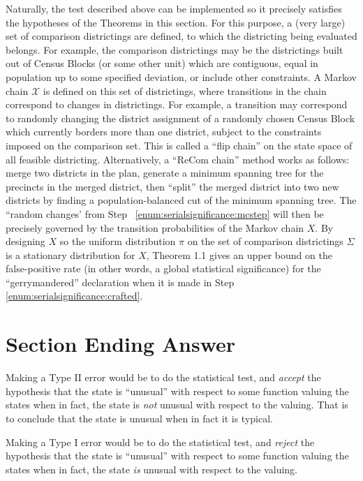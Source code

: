 \documentclass[12pt]{article}
\begin{document}
Naturally, the test described above can be implemented so it precisely
satisfies the hypotheses of the Theorems in this section.  For this
purpose, a (very large) set of comparison districtings are defined, to
which the districting being evaluated belongs.  For example, the
comparison districtings may be the districtings built out of Census
Blocks (or some other unit) which are contiguous, equal in population up
to some specified deviation, or include other constraints.  A Markov
chain \( \mathcal{X} \) is defined on this set of districtings, where
transitions in the chain correspond to changes in districtings.  For
example, a transition may correspond to randomly changing the district
assignment of a randomly chosen Census Block which currently borders
more than one district, subject to the constraints imposed on the
comparison set.  This is called a ``flip chain'' on the state space of all
feasible districting.  Alternatively, a ``ReCom chain'' method works as
follows:  merge two districts in the plan, generate a minimum spanning
tree for the precincts in the merged district, then ``split'' the merged
district into two new districts by finding a population-balanced cut of
the minimum spanning tree.  The ``random changes' from Step~%
\ref{enum:serialsignificance:mcstep} will then be precisely governed by the
transition probabilities of the Markov chain \( X \).  By designing \( X
\) so the uniform distribution \( \pi \) on the set of comparison
districtings \( \Sigma \) is a stationary distribution for \( X \),
Theorem 1.1 gives an upper bound on the false-positive rate (in other
words, a global statistical significance) for the ``gerrymandered''
declaration when it is made in Step~%
\ref{enum:serialsignificance:crafted}.

\section*{Section Ending Answer}

Making a Type II error would be to do the statistical test, and \emph{accept}
the hypothesis that the state is ``unusual'' with respect to some
function valuing the states when in fact, the state is \emph{not}
unusual with respect to the valuing.  That is to conclude that the state
is unusual when in fact it is typical.

Making a Type I error would be to do the statistical test, and \emph{reject}
the hypothesis that the state is ``unusual'' with respect to some
function valuing the states when in fact, the state \emph{is} unusual
with respect to the valuing.
\end{document}
